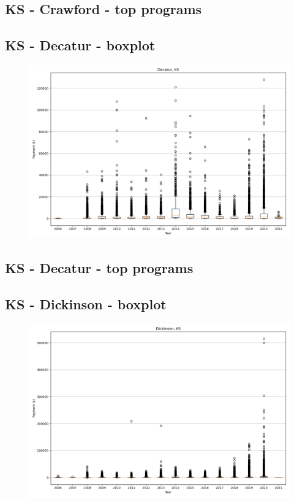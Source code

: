 \subsection*{KS - Crawford - top programs}

\newpage
\subsection*{KS - Decatur - boxplot}
\begin{figure}[h]
\centering
\includegraphics[width=7in]{../output/boxplots/counties/Decatur-KS_boxplot.png}
\end{figure}


\subsection*{KS - Decatur - top programs}

\newpage
\subsection*{KS - Dickinson - boxplot}
\begin{figure}[h]
\centering
\includegraphics[width=7in]{../output/boxplots/counties/Dickinson-KS_boxplot.png}
\end{figure}


